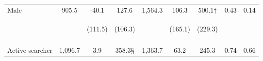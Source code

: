 \begin{table}[h!]
{\begin{tabular}{lcccccccc}
\noalign{\smallskip}Male & 905.5 & -40.1 & 127.6 & 1,564.3 & 106.3 & 500.1† & 0.43 & 0.14\\
 & \begin{footnotesize}\end{footnotesize} & \begin{footnotesize}(111.5)\end{footnotesize} & \begin{footnotesize}(106.3)\end{footnotesize} & \begin{footnotesize}\end{footnotesize} & \begin{footnotesize}(165.1)\end{footnotesize} & \begin{footnotesize}(229.3)\end{footnotesize} & \begin{footnotesize}\end{footnotesize} & \begin{footnotesize}\end{footnotesize}\\
 & \begin{footnotesize}\end{footnotesize} & \begin{footnotesize}[1.000]\end{footnotesize} & \begin{footnotesize}[0.071]\end{footnotesize} & \begin{footnotesize}\end{footnotesize} & \begin{footnotesize}[1.000]\end{footnotesize} & \begin{footnotesize}[0.181]\end{footnotesize} & \begin{footnotesize}\end{footnotesize} & \begin{footnotesize}\end{footnotesize}\\
\noalign{\smallskip}Active searcher & 1,096.7 & 3.9 & 358.3§ & 1,363.7 & 63.2 & 245.3 & 0.74 & 0.66\\

\end{tabular}}
\end{table}
